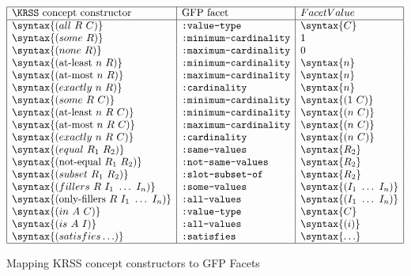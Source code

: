 \begin{table}[tbph]
\begin{displaymath}
\begin{array}{|l|l|l|l|} \hline
\mbox{\KRSS\ concept constructor} &  \mbox{GFP facet}  & {Facet Value} \\ \hline
\syntax{(all~R~C)} & {\mbox {\tt :value-type}} & \syntax{C} \\
\syntax{(some~R)} & {\mbox {\tt :minimum-cardinality}} & 1 \\
\syntax{(none~R)} & {\mbox {\tt :maximum-cardinality}}  & 0 \\
\syntax{\mbox{(at-least}~n~R)} & {\mbox {\tt :minimum-cardinality}} & \syntax{n} \\
\syntax{\mbox{(at-most}~n~R)} &  {\mbox {\tt :maximum-cardinality}} & \syntax{n} \\
\syntax{(exactly~n~R)} &  {\mbox {\tt :cardinality}} & \syntax{n} \\
\syntax{(some~R~C)} &  {\mbox {\tt :minimum-cardinality}} & \syntax{(1~C)} \\
\syntax{\mbox{(at-least}~n~R~C)} & {\mbox {\tt :minimum-cardinality}} & \syntax{(n~C)}  \\
\syntax{\mbox{(at-most}~n~R~C)} &  {\mbox {\tt :maximum-cardinality}}  & \syntax{(n~C)} \\
\syntax{(exactly~n~R~C)}  &   {\mbox {\tt :cardinality}} & \syntax{(n~C)} \\
\syntax{(equal~R_1~R_2)} &  {\mbox {\tt :same-values}} &\syntax{R_2}  \\
\syntax{(\mbox{not-equal}~R_1~R_2)}  & {\mbox {\tt :not-same-values}} & \syntax{R_2} \ \\
\syntax{(subset~R_1~R_2)} &  {\mbox {\tt :slot-subset-of}} & \syntax{R_2} \\
\syntax{(fillers~R~I_1~\ldots~I_n)}   & {\mbox {\tt :some-values}} & \syntax{(I_1~\ldots~I_n)}  \\
\syntax{\mbox{(only-fillers}~R~I_1~\ldots~I_n)}  & {\mbox {\tt :all-values}}  & \syntax{(I_1~\ldots~I_n)}  \\
\syntax{(in~A~C)} &{\mbox {\tt :value-type}} & \syntax{C} \\
\syntax{(is~A~I)} &   {\mbox {\tt :all-values}} & \syntax{(i)} \\
\syntax{(satisfies \ldots)} &  {\mbox {\tt :satisfies}} & \syntax{\ldots} \\ \hline
\end{array}
\end{displaymath}
\caption{Mapping KRSS concept constructors to GFP Facets}
\label{tab:concept-table}
\end{table}

